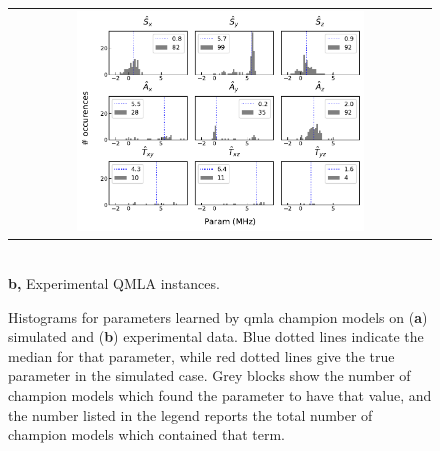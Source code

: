 \begin{figure}
    \centering
    \begin{tabular}{@{}c@{}}
        \centering
        \includegraphics[width=0.7\textwidth]{experimental_study/figures/params_experimental.pdf}
    \end{tabular}
    \\
    \small \textbf{b,} Experimental QMLA instances.
    \caption[
        Histograms for parameters learned by \gls{qmla} \glspl{champion model} on simulated and experimental data
    ]{
        Histograms for parameters learned by \gls{qmla} \glspl{champion model} on (\textbf{a}) simulated  and (\textbf{b}) experimental data. 
        Blue dotted lines indicate the median for that parameter, while red dotted lines give the true parameter in the simulated case. 
        Grey blocks show the number of champion models which found the parameter to have that value,
        and the number listed in the legend reports the total number of \glspl{champion model} which contained that term.
        \figtableref
    }
    \label{fig:nv_learned_params}
\end{figure}